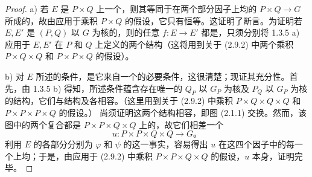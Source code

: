 \begin{proof}
a) 若 $E$ 是 $P\times Q$ 上一个，则其等同于在两个部分因子上均的 $P\times Q\to G$ 所成的，故由应用于乘积 $P\times Q$ 的假设，它只有恒等。这证明了断言。为证明若 $E,E'$ 是 $(P,Q)$ 以 $G$ 为核的，则的任意 $f:E\to E'$ 都是，只须分别将 1.3.5 a) 应用于 $E,E'$ 在 $P$ 和 $Q$ 上定义的两个结构（这将用到关于 (2.9.2) 中两个乘积 $P\times Q\times Q$ 和 $P\times P\times Q$ 的假设）。

b) 对 $E$ 所述的条件，是它来自一个的必要条件，这很清楚；现证其充分性。首先，由 1.3.5 b) 得知，所述条件蕴含存在唯一的 $Q_P$ 以 $G_P$ 为核及 $P_Q$ 以 $G_P$ 为核的结构，它们与结构及各相容。（这里用到关于 (2.9.2) 中乘积 $P\times Q\times Q\times Q$ 和 $P\times P\times P\times Q$ 的假设。）
尚须证明这两个结构相容，即图 (2.1.1) 交换。然而，该图中的两个复合都是 $P\times P\times Q\times Q$ 上的，故它们相差一个
\[
u:P\times P\times Q\times Q\longrightarrow G。
\]
利用 $E$ 的各部分分别为 $\varphi$ 和 $\psi$ 的这一事实，容易得出 $u$ 在这四个因子中的每一个上均；于是，由应用于 (2.9.2) 中乘积 $P\times P\times Q\times Q$ 的假设，$u$ 本身，证明完毕。
\end{proof}

